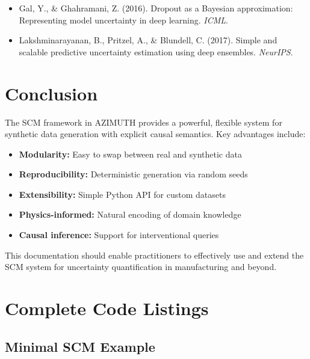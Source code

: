 \documentclass[11pt,a4paper]{article}
\begin{document}
\begin{itemize}
    \item Gal, Y., \& Ghahramani, Z. (2016). Dropout as a Bayesian approximation: Representing model uncertainty in deep learning. \emph{ICML}.
    \item Lakshminarayanan, B., Pritzel, A., \& Blundell, C. (2017). Simple and scalable predictive uncertainty estimation using deep ensembles. \emph{NeurIPS}.
\end{itemize}

\section{Conclusion}

The SCM framework in AZIMUTH provides a powerful, flexible system for synthetic data generation with explicit causal semantics. Key advantages include:

\begin{itemize}
    \item \textbf{Modularity:} Easy to swap between real and synthetic data
    \item \textbf{Reproducibility:} Deterministic generation via random seeds
    \item \textbf{Extensibility:} Simple Python API for custom datasets
    \item \textbf{Physics-informed:} Natural encoding of domain knowledge
    \item \textbf{Causal inference:} Support for interventional queries
\end{itemize}

This documentation should enable practitioners to effectively use and extend the SCM system for uncertainty quantification in manufacturing and beyond.

\appendix

\section{Complete Code Listings}

\subsection{Minimal SCM Example}
\end{document}

